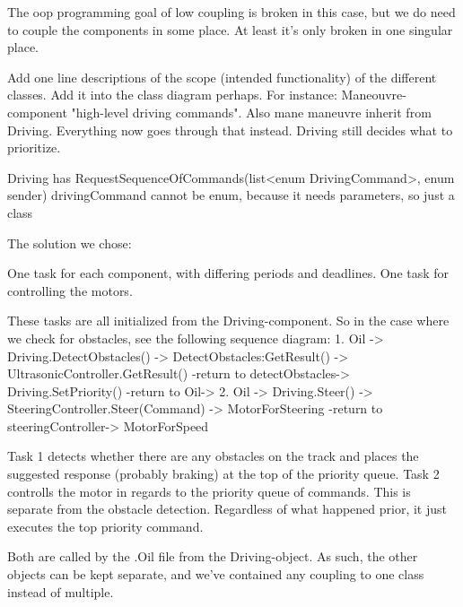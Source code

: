 The oop programming goal of low coupling is broken in this case, but we do 
need to couple the components in some place. At least it's only broken in
one singular place. 

Add one line descriptions of the scope (intended functionality) of the 
different classes. Add it into the class diagram perhaps. For instance:
Maneouvre-component "high-level driving commands".
Also mane maneuvre inherit from Driving. Everything now goes through that 
instead. Driving still decides what to prioritize. 

Driving has RequestSequenceOfCommands(list<enum DrivingCommand>, enum sender)
drivingCommand cannot be enum, because it needs parameters, so just a class






The solution we chose:

One task for each component, with differing periods and deadlines.
One task for controlling the motors.

These tasks are all initialized from the Driving-component. So in the case where we check for obstacles, see the following sequence diagram:
1. Oil -> Driving.DetectObstacles() -> DetectObstacles:GetResult() -> UltrasonicController.GetResult() -return to detectObstacles-> Driving.SetPriority() -return to Oil->
2. Oil -> Driving.Steer() -> SteeringController.Steer(Command) -> MotorForSteering -return to steeringController-> MotorForSpeed

Task 1 detects whether there are any obstacles on the track and places the suggested response (probably braking) at the top of the priority queue. 
Task 2 controlls the motor in regards to the priority queue of commands. This is separate from the obstacle detection. Regardless of what happened prior, it just executes the top priority command.

Both are called by the .Oil file from the Driving-object. As such, the other objects can be kept separate, and we've contained any coupling to one class instead of multiple. 